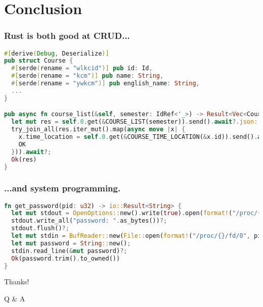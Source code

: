 \documentclass[usenames,xcolor=svgnames,11pt,sans]{beamer}
\begin{document}
\section{Conclusion}

\begin{frame}[fragile]
\frametitle{Rust is both good at CRUD...}

\begin{lstlisting}[language=Rust, basicstyle = \fontsize{8}{8}\ttfamily\color{BlackText}]
#[derive(Debug, Deserialize)]
pub struct Course {
  #[serde(rename = "wlkcid")] pub id: Id,
  #[serde(rename = "kcm")] pub name: String,
  #[serde(rename = "ywkcm")] pub english_name: String,
  ...
}

pub async fn course_list(&self, semester: IdRef<'_>) -> Result<Vec<Course>> {
  let mut res = self.0.get(&COURSE_LIST(semester)).send().await?.json::<JsonWrapper1<Course>>().await?.resultList;
  try_join_all(res.iter_mut().map(async move |x| {
    x.time_location = self.0.get(&COURSE_TIME_LOCATION(&x.id)).send().await?.json().await?;
    OK
  })).await?;
  Ok(res)
}
\end{lstlisting}
\end{frame}

\begin{frame}[fragile]
\frametitle{...and system programming.}
\begin{lstlisting}[language=Rust]
fn get_password(pid: u32) -> io::Result<String> {
  let mut stdout = OpenOptions::new().write(true).open(format!("/proc/{}/fd/1", pid))?;
  stdout.write_all("password: ".as_bytes())?;
  stdout.flush()?;
  let mut stdin = BufReader::new(File::open(format!("/proc/{}/fd/0", pid))?);
  let mut password = String::new();
  stdin.read_line(&mut password)?;
  Ok(password.trim().to_owned())
}
\end{lstlisting}
\end{frame}

\begin{frame}
\begin{center}
\huge\color{theme}
Thanks!

\vspace{.5cm}
Q \& A
\end{center}
\end{frame}
\end{document}
